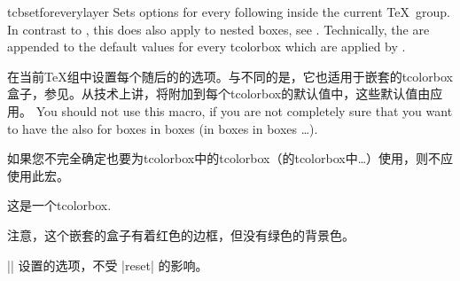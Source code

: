 \begin{docCommand}{tcbsetforeverylayer}{}
Sets options for every following  inside the current \TeX\ group.
In contrast to , this does also
apply to nested boxes, see .
Technically, the  are appended to the default values for every
tcolorbox which are applied by .


在当前\TeX 组中设置每个随后的的选项。与不同的是，它也适用于嵌套的tcolorbox盒子，参见。从技术上讲，将附加到每个tcolorbox的默认值中，这些默认值由应用。\parpar
You should not use this macro, if you are not completely sure that you
want to have the  also for boxes in boxes (in boxes in boxes \ldots).


如果您不完全确定也要为tcolorbox中的tcolorbox（的tcolorbox中\ldots）使用，则不应使用此宏。
\begin{dispExample}

\begin{tcolorbox}[title=All options for this box]
这是一个tcolorbox.\par\medskip
  \begin{tcolorbox}[title=嵌套的盒子]
    注意，这个嵌套的盒子有着红色的边框，但没有绿色的背景色。
  \end{tcolorbox}
\end{tcolorbox}
\bigskip

\begin{tcolorbox}[reset]
|\tcbsetforeverylayer| 设置的选项，不受 |reset| 的影响。
\end{tcolorbox}
\end{dispExample}
\end{docCommand}
